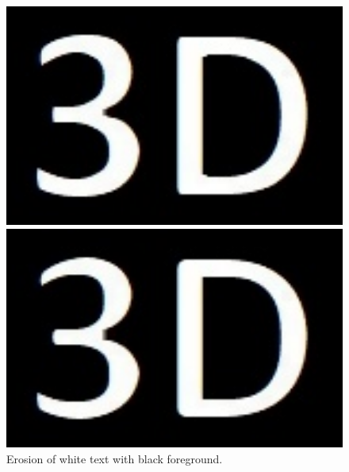 \begin{figure}[h!]
\begin{minipage}[t]{0.24\textwidth}
	\end{minipage}
	\begin{minipage}[t]{0.24\textwidth}
		\centering	
		\includegraphics[width=1\textwidth]{figures/ImageAnalysis/Reconstruct/3D_Erode_Ellipse.jpg}	
	\end{minipage}
	\begin{minipage}[t]{0.24\textwidth}
		\centering	
		\includegraphics[width=1\textwidth]{figures/ImageAnalysis/Reconstruct/3D_Erode_Rectangle.jpg}
	\end{minipage}
	\caption{Erosion of white text with black foreground.}
	\label{fig:erosion}
\end{figure}

